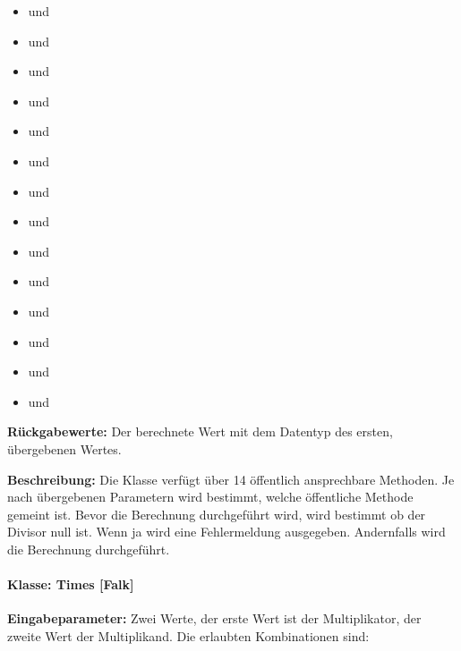 \begin{itemize}
	\item {} und 
	\item {} und 
	\item {} und  
	\item {} und  
	\item {} und 
	\item {} und 
	\item {} und 
	\item {} und 
	\item {} und 
	\item {} und 
	\item {} und 
	\item {} und 
	\item {} und 
	\item {} und  
\end{itemize}

\textbf{Rückgabewerte:} Der berechnete Wert mit dem Datentyp des ersten, übergebenen Wertes.
 
\textbf{Beschreibung: }Die Klasse verfügt über 14 öffentlich ansprechbare Methoden. Je nach übergebenen Parametern wird bestimmt, welche öffentliche Methode gemeint ist. Bevor die Berechnung durchgeführt wird, wird bestimmt ob der Divisor null ist. Wenn ja wird eine Fehlermeldung ausgegeben. Andernfalls wird die Berechnung durchgeführt. 

\paragraph{Klasse: Times [Falk]}

\textbf{Eingabeparameter: }Zwei Werte, der erste Wert ist der Multiplikator, der zweite Wert der Multiplikand. Die erlaubten Kombinationen sind: 

